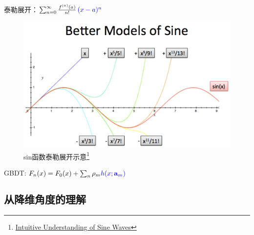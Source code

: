 \begin{frame}
    泰勒展开：$\sum _{n=0}^{\infty }{\frac{f^{(n)}(a)}{n!}}\,\textcolor{blue}{(x-a)^{n}}$

    \begin{figure}[!tb]
        \includegraphics[width=\twopicwidth]{figure/gbdt/sine-better-models}
        \caption{sin函数泰勒展开示意\footnote{
                 \href{https://betterexplained.com/articles/intuitive-understanding-of-sine-waves/}{Intuitive Understanding of Sine Waves}}}
    \end{figure}

    GBDT: $F_n(x) = F_{0}(x) + \sum_n \rho_m \textcolor{blue}{h(x; \mathbf{a}_m)}$
\end{frame}


\subsection{从降维角度的理解}

